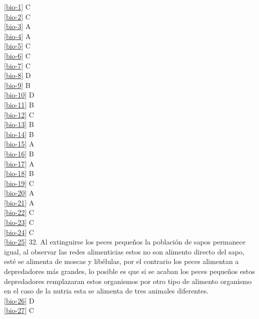 \noindent \ref{bio-1} C\\
\ref{bio-2} C\\
\ref{bio-3} A\\
\ref{bio-4} A\\
\ref{bio-5} C\\
\ref{bio-6} C\\
\ref{bio-7} C\\
\ref{bio-8} D\\
\ref{bio-9} B\\
\ref{bio-10} D\\
\ref{bio-11} B\\
\ref{bio-12} C\\
\ref{bio-13} B\\
\ref{bio-14} B\\
\ref{bio-15} A\\
\ref{bio-16} B\\
\ref{bio-17} A\\
\ref{bio-18} B\\
\ref{bio-19} C\\
\ref{bio-20} A\\
\ref{bio-21} A\\
\ref{bio-22} C\\
\ref{bio-23} C\\
\ref{bio-24} C\\
\ref{bio-25} 32. Al extinguirse los peces pequeños la población de sapos permanece igual, al observar las redes alimenticias estos  no son alimento directo del sapo, esté se alimenta de moscas y libélulas, por el contrario  los peces alimentan  a depredadores más grandes, lo posible es que si se acaban los peces pequeños estos  depredadores remplazaran  estos organismos por otro tipo de alimento organismo en el caso de la nutria esta se alimenta de tres animales  diferentes.\\
\ref{bio-26} D\\
\ref{bio-27} C\\



